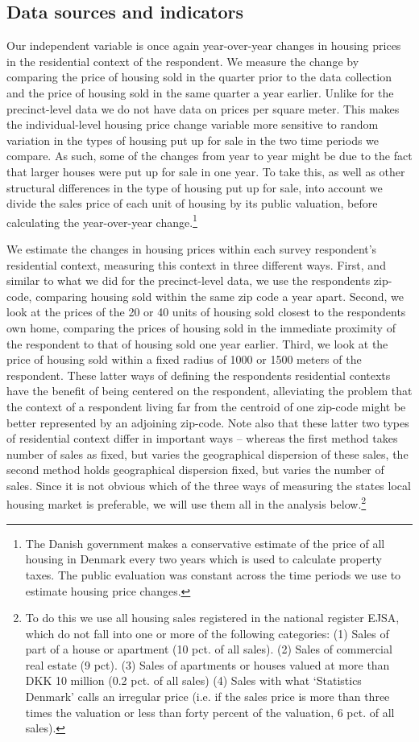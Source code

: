 \documentclass[12pt,a4paper]{article}
\begin{document}
\subsection{Data sources and indicators}
Our independent variable is once again year-over-year changes in housing prices in the residential context of the respondent. We measure the change by comparing the price of housing sold in the quarter prior to the data collection and the price of housing sold in the same quarter a year earlier. Unlike for the precinct-level data  we do not have data on prices per square meter. This makes the individual-level housing price change variable more sensitive to random variation in the types of housing put up for sale in the two time periods we compare. As such, some of the changes from year to year might be due to the fact that larger houses were put up for sale in one year. To take this, as well as other structural differences in the type of housing put up for sale, into account we divide the sales price of each unit of housing by its public valuation, before calculating the year-over-year change.\footnote{The Danish government makes a conservative estimate of the price of all housing in Denmark every two years which is used to calculate property taxes. The public evaluation was constant across the time periods we use to estimate housing price changes.} 

We estimate the changes in housing prices within each survey respondent's residential context, measuring this context  in three different ways. First, and similar to what we did for the precinct-level data, we use the respondents zip-code, comparing housing sold within the same zip code a year apart. Second, we look at the prices of the 20 or 40 units of housing sold closest to the respondents own home, comparing the prices of housing sold in the immediate proximity of the respondent to that of housing sold one year earlier. Third, we look at the price of housing sold within a fixed radius of 1000 or 1500 meters of the respondent. These latter ways of defining the respondents residential contexts have the benefit of being centered on the respondent, alleviating the problem that the context of a respondent living far from the centroid of one zip-code might be better represented by an adjoining zip-code. Note also that these latter two types of residential context differ in important ways -- whereas the first method takes number of sales as fixed, but varies the geographical dispersion of these sales, the second method holds geographical dispersion fixed, but varies the number of sales. Since it is not obvious which of the three ways of measuring the states local housing market is preferable, we will use them all in the analysis below.\footnote{To do this we use all housing sales registered in the national register EJSA, which do not fall into one or more of the following categories: (1) Sales of part of a house or apartment (10 pct. of all sales). (2) Sales of commercial real estate (9 pct). (3) Sales of apartments or houses valued at more than DKK 10 million (0.2 pct. of all sales) (4) Sales with what `Statistics Denmark' calls an irregular price (i.e. if the sales price is more than three times the valuation or less than forty percent of the valuation, 6 pct. of all sales).}
\end{document}
